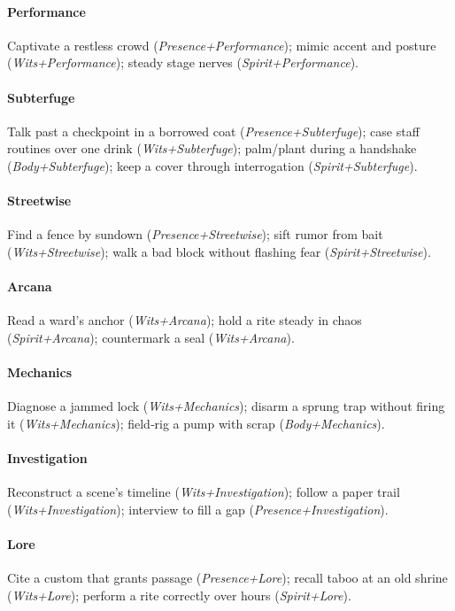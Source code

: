 \paragraph{Performance}
Captivate a restless crowd (\emph{Presence+Performance}); mimic accent and posture (\emph{Wits+Performance}); steady stage nerves (\emph{Spirit+Performance}).

\paragraph{Subterfuge}
Talk past a checkpoint in a borrowed coat (\emph{Presence+Subterfuge}); case staff routines over one drink (\emph{Wits+Subterfuge}); palm/plant during a handshake (\emph{Body+Subterfuge}); keep a cover through interrogation (\emph{Spirit+Subterfuge}).

\paragraph{Streetwise}
Find a fence by sundown (\emph{Presence+Streetwise}); sift rumor from bait (\emph{Wits+Streetwise}); walk a bad block without flashing fear (\emph{Spirit+Streetwise}).

\paragraph{Arcana}
Read a ward's anchor (\emph{Wits+Arcana}); hold a rite steady in chaos (\emph{Spirit+Arcana}); countermark a seal (\emph{Wits+Arcana}).

\paragraph{Mechanics}
Diagnose a jammed lock (\emph{Wits+Mechanics}); disarm a sprung trap without firing it (\emph{Wits+Mechanics}); field‑rig a pump with scrap (\emph{Body+Mechanics}).

\paragraph{Investigation}
Reconstruct a scene's timeline (\emph{Wits+Investigation}); follow a paper trail (\emph{Wits+Investigation}); interview to fill a gap (\emph{Presence+Investigation}).

\paragraph{Lore}
Cite a custom that grants passage (\emph{Presence+Lore}); recall taboo at an old shrine (\emph{Wits+Lore}); perform a rite correctly over hours (\emph{Spirit+Lore}).

